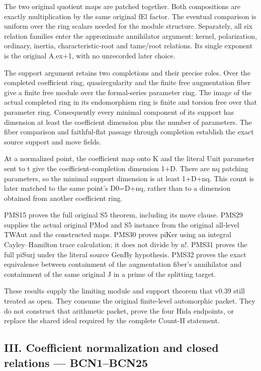 The two original quotient maps are patched together. Both compositions are exactly multiplication by the same original fEl factor. The eventual comparison is uniform over the ring scalars needed for the module structure. Separately, all six relation families enter the approximate annihilator argument: kernel, polarization, ordinary, inertia, characteristic-root and tame/\allowbreak{}root relations. Its single exponent is the original A.ex+1, with no unrecorded later choice.

The support argument retains two completions and their precise roles. Over the completed coefficient ring, quasiregularity and the finite free augmentation fiber give a finite free module over the formal-series parameter ring. The image of the actual completed ring in its endomorphism ring is finite and torsion free over that parameter ring. Consequently every minimal component of its support has dimension at least the coefficient dimension plus the number of parameters. The fiber comparison and faithful-flat passage through completion establish the exact source support and move fields.

At a normalized point, the coefficient map onto K and the literal Unit parameter sent to t give the coefficient-completion dimension 1+D. There are nq patching parameters, so the minimal support dimension is at least 1+D+nq. This count is later matched to the same point's D0=D+nq, rather than to a dimension obtained from another coefficient ring.

PMS15 proves the full original S5 theorem, including its move clause. PMS29 supplies the actual original PMod and S5 instance from the original all-level TWAut and the constructed maps. PMS30 proves piKer using an integral Cayley–Hamilton trace calculation; it does not divide by n!. PMS31 proves the full piSurj under the literal source GenBy hypothesis. PMS32 proves the exact equivalence between containment of the augmentation fiber's annihilator and containment of the same original J in a prime of the splitting target.

These results supply the limiting module and support theorem that v0.39 still treated as open. They consume the original finite-level automorphic packet. They do not construct that arithmetic packet, prove the four Hida endpoints, or replace the shared ideal required by the complete Count-II statement.

\subsection{III. Coefficient normalization and closed relations — BCN1–BCN25}

